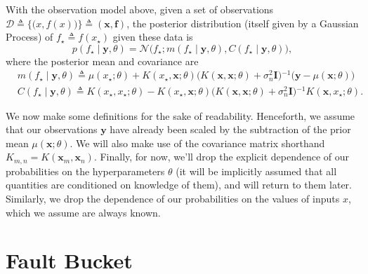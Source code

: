 \documentclass{article} %
\newcommand{\deq}{\ensuremath{\triangleq}}
\newcommand{\given}{\!\ensuremath{\mid}\!}
\newcommand{\cm}[1]{\ensuremath{\mathcal{#1}}}
\newcommand{\bm}[1]{\ensuremath{\mathbf{#1}}}
\newcommand{\data}{\ensuremath{\cm{D}}}
\newcommand{\inv}{\ensuremath{^{-1}}}
\newcommand{\vect}[1]{\bm{#1}}
\newcommand{\vy}{\vect{y}}
\newcommand{\vx}{\vect{x}}
\newcommand{\mean}[2]{{m}(#1\given#2)}
\newcommand{\cov}[2]{{C}(#1\given#2)}
\newcommand{\st}{_{\star}}
\newcommand{\defequal}{=}
\begin{document}
With the observation model above, given a set of observations
$
 \data
 \deq
 \bigl\lbrace
   \bigl( x, f(x) \bigr)
 \bigr\rbrace
 \deq
 ( \bm{x}, \bm{f} )
$,
the posterior distribution (itself given by a Gaussian Process) of $f\st \deq f(x\st)$ given these data is
\begin{equation*}
 p(f\st \given \vy, \theta)
 =
 \cm{N}
 \bigl(
   f\st;
   \mean{f\st}{\vy,\theta},
   \cov{f\st}{\vy,\theta}
 \bigr),
\end{equation*}
where the posterior mean and covariance are
\begin{align*}
 &
 \mean{f\st}{\vy,\theta}
 \deq
 \mu(x\st; \theta)
 +
 K(x\st, \bm{x}; \theta)
 \bigl(
 K(\bm{x}, \bm{x}; \theta) + \sigma_n^2 \bm{I}
 \bigr)\inv
 \bigl(
   \bm{y} - \mu(\bm{x}; \theta)
 \bigr)
 \\  
 &
 \cov{f\st}{\vy,\theta}
 \deq
 K(x\st, x\st; \theta)
 -
 K(x\st, \bm{x}; \theta)
 \bigl(
   K(\bm{x}, \bm{x}; \theta) + \sigma_n^2 \bm{I}
 \bigr)\inv
 K(\bm{x}, x\st; \theta).
\end{align*}

We now make some definitions for the sake of readability. Henceforth,
we assume that our observations $\vy$ have already been scaled by the
subtraction of the prior mean $\mu(\bm{x}; \theta)$. We will also make
use of the covariance matrix shorthand $K_{m,n} \defequal
K(\vx_m,\vx_n)$. Finally, for now, we'll drop the explicit dependence
of our probabilities on the hyperparameters $\theta$ (it will be
implicitly assumed that all quantities are conditioned on knowledge of
them), and will return to them later. Similarly, we drop the dependence of our probabilities on the values of inputs $x$, which we assume are always known.

\section{Fault Bucket}\label{bucket}
\end{document}
